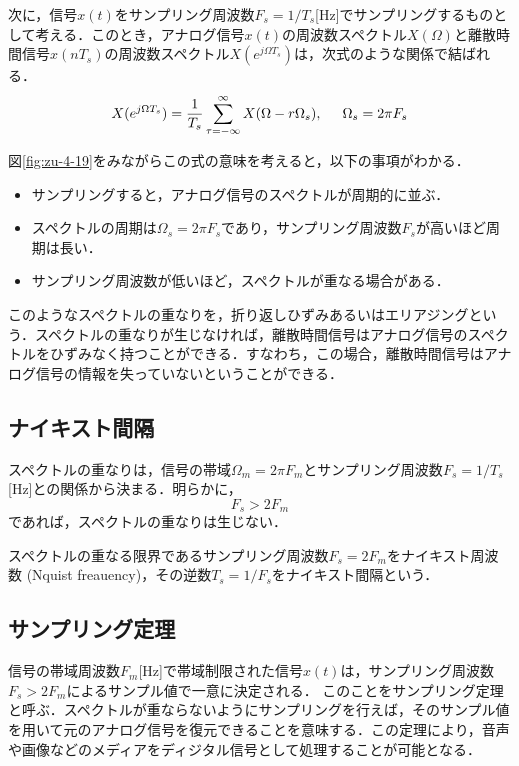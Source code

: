 次に，信号$x(t)$をサンプリング周波数$F_s=1/T_s$[Hz]でサンプリングするものとして考える．このとき，アナログ信号$x(t)$の周波数スペクトル$X(\Omega)$と離散時間信号$x(nT_s)$の周波数スペクトル$X(e^{j\Omega T_s})$は，次式のような関係で結ばれる．
\begin{equation}
X(e^{j\Omega T_s})=\frac{1}{T_s} \sum_{\tau = -\infty}^{\infty}X(\Omega -r \Omega_s), \hspace{5mm} \Omega_s=2\pi F_s
\end{equation}

図\ref{fig:zu-4-19}をみながらこの式の意味を考えると，以下の事項がわかる．
\begin{itemize}
\item サンプリングすると，アナログ信号のスペクトルが周期的に並ぶ．
\item スペクトルの周期は$\Omega_s = 2\pi F_s$であり，サンプリング周波数$F_s$が高いほど周期は長い．
\item サンプリング周波数が低いほど，スペクトルが重なる場合がある．
\end{itemize}

このようなスペクトルの重なりを，折り返しひずみあるいはエリアジングという．スペクトルの重なりが生じなければ，離散時間信号はアナログ信号のスペクトルをひずみなく持つことができる．すなわち，この場合，離散時間信号はアナログ信号の情報を失っていないということができる．

\subsection{ナイキスト間隔}

スペクトルの重なりは，信号の帯域$\Omega_m = 2\pi F_m$とサンプリング周波数$F_s=1/T_s$[Hz]との関係から決まる．明らかに，
\begin{equation}
F_s > 2F_m
\end{equation}
であれば，スペクトルの重なりは生じない．

スペクトルの重なる限界であるサンプリング周波数$F_s=2F_m$をナイキスト周波数 (Nquist freauency)，その逆数$T_s=1/F_s$をナイキスト間隔という．

\subsection{サンプリング定理}

信号の帯域周波数$F_m$[Hz]で帯域制限された信号$x(t)$は，サンプリング周波数$F_s>2F_m$によるサンプル値で一意に決定される．
%
このことをサンプリング定理と呼ぶ．スペクトルが重ならないようにサンプリングを行えば，そのサンプル値を用いて元のアナログ信号を復元できることを意味する．この定理により，音声や画像などのメディアをディジタル信号として処理することが可能となる．
